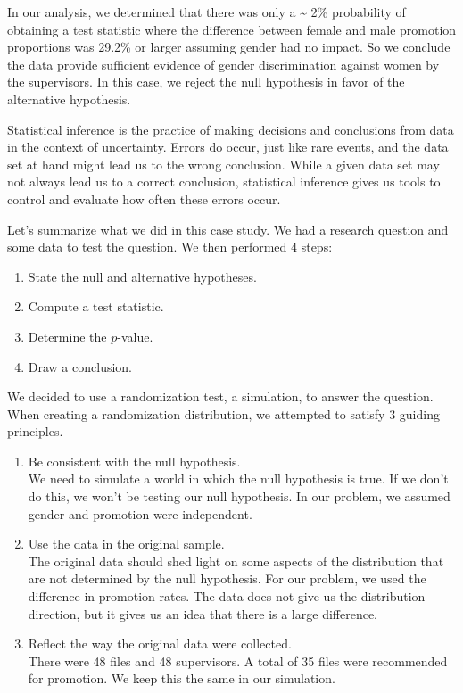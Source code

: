 \documentclass[
  letterpaper,
  DIV=11,
  numbers=noendperiod]{scrreprt}
\providecommand{\tightlist}{%
  \setlength{\itemsep}{0pt}\setlength{\parskip}{0pt}}\usepackage{longtable,booktabs,array}
\begin{document}
In our analysis, we determined that there was only a \textasciitilde{}
2\% probability of obtaining a test statistic where the difference
between female and male promotion proportions was 29.2\% or larger
assuming gender had no impact. So we conclude the data provide
sufficient evidence of gender discrimination against women by the
supervisors. In this case, we reject the null hypothesis in favor of the
alternative hypothesis.

Statistical inference is the practice of making decisions and
conclusions from data in the context of uncertainty. Errors do occur,
just like rare events, and the data set at hand might lead us to the
wrong conclusion. While a given data set may not always lead us to a
correct conclusion, statistical inference gives us tools to control and
evaluate how often these errors occur.

Let's summarize what we did in this case study. We had a research
question and some data to test the question. We then performed 4 steps:

\begin{enumerate}
\def\labelenumi{\arabic{enumi}.}
\tightlist
\item
  State the null and alternative hypotheses.\\
\item
  Compute a test statistic.\\
\item
  Determine the \(p\)-value.\\
\item
  Draw a conclusion.
\end{enumerate}

We decided to use a randomization test, a simulation, to answer the
question. When creating a randomization distribution, we attempted to
satisfy 3 guiding principles.

\begin{enumerate}
\def\labelenumi{\arabic{enumi}.}
\tightlist
\item
  Be consistent with the null hypothesis.\\
  We need to simulate a world in which the null hypothesis is true. If
  we don't do this, we won't be testing our null hypothesis. In our
  problem, we assumed gender and promotion were independent.\\
\item
  Use the data in the original sample.\\
  The original data should shed light on some aspects of the
  distribution that are not determined by the null hypothesis. For our
  problem, we used the difference in promotion rates. The data does not
  give us the distribution direction, but it gives us an idea that there
  is a large difference.\\
\item
  Reflect the way the original data were collected.\\
  There were 48 files and 48 supervisors. A total of 35 files were
  recommended for promotion. We keep this the same in our simulation.
\end{enumerate}
\end{document}

